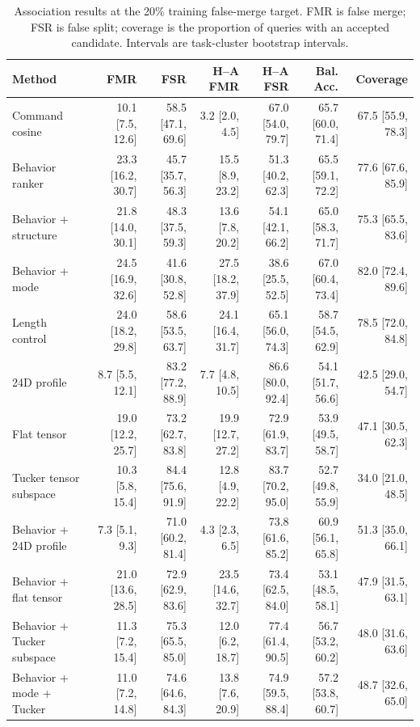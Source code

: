 \begin{table}[t]
\centering
\scriptsize
\setlength{\tabcolsep}{2.4pt}
\renewcommand{\arraystretch}{1.18}
\begin{tabular}{lrrrrrr}
\toprule
Method & FMR & FSR & H--A FMR & H--A FSR & Bal. Acc. & Coverage \\
\midrule
Command cosine & 10.1 [7.5, 12.6] & 58.5 [47.1, 69.6] & 3.2 [2.0, 4.5] & 67.0 [54.0, 79.7] & 65.7 [60.0, 71.4] & 67.5 [55.9, 78.3] \\
Behavior ranker & 23.3 [16.2, 30.7] & 45.7 [35.7, 56.3] & 15.5 [8.9, 23.2] & 51.3 [40.2, 62.3] & 65.5 [59.1, 72.2] & 77.6 [67.6, 85.9] \\
Behavior + structure & 21.8 [14.0, 30.1] & 48.3 [37.5, 59.3] & 13.6 [7.8, 20.2] & 54.1 [42.1, 66.2] & 65.0 [58.3, 71.7] & 75.3 [65.5, 83.6] \\
Behavior + mode & 24.5 [16.9, 32.6] & 41.6 [30.8, 52.8] & 27.5 [18.2, 37.9] & 38.6 [25.5, 52.5] & 67.0 [60.4, 73.4] & 82.0 [72.4, 89.6] \\
Length control & 24.0 [18.2, 29.8] & 58.6 [53.5, 63.7] & 24.1 [16.4, 31.7] & 65.1 [56.0, 74.3] & 58.7 [54.5, 62.9] & 78.5 [72.0, 84.8] \\
24D profile & 8.7 [5.5, 12.1] & 83.2 [77.2, 88.9] & 7.7 [4.8, 10.5] & 86.6 [80.0, 92.4] & 54.1 [51.7, 56.6] & 42.5 [29.0, 54.7] \\
Flat tensor & 19.0 [12.2, 25.7] & 73.2 [62.7, 83.8] & 19.9 [12.7, 27.2] & 72.9 [61.9, 83.7] & 53.9 [49.5, 58.7] & 47.1 [30.5, 62.3] \\
Tucker tensor subspace & 10.3 [5.8, 15.4] & 84.4 [75.6, 91.9] & 12.8 [4.9, 22.2] & 83.7 [70.2, 95.0] & 52.7 [49.8, 55.9] & 34.0 [21.0, 48.5] \\
Behavior + 24D profile & 7.3 [5.1, 9.3] & 71.0 [60.2, 81.4] & 4.3 [2.3, 6.5] & 73.8 [61.6, 85.2] & 60.9 [56.1, 65.8] & 51.3 [35.0, 66.1] \\
Behavior + flat tensor & 21.0 [13.6, 28.5] & 72.9 [62.9, 83.6] & 23.5 [14.6, 32.7] & 73.4 [62.5, 84.0] & 53.1 [48.5, 58.1] & 47.9 [31.5, 63.1] \\
Behavior + Tucker subspace & 11.3 [7.2, 15.4] & 75.3 [65.5, 85.0] & 12.0 [6.2, 18.7] & 77.4 [61.4, 90.5] & 56.7 [53.2, 60.2] & 48.0 [31.6, 63.6] \\
Behavior + mode + Tucker & 11.0 [7.2, 14.8] & 74.6 [64.6, 84.3] & 13.8 [7.6, 20.9] & 74.9 [59.5, 88.4] & 57.2 [53.8, 60.7] & 48.7 [32.6, 65.0] \\
\bottomrule
\end{tabular}
\caption{Association results at the 20\% training false-merge target. FMR is false merge; FSR is false split; coverage is the proportion of queries with an accepted candidate. Intervals are task-cluster bootstrap intervals.}
\label{tab:multidimensional-profile-results}
\end{table}

